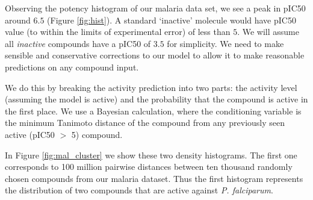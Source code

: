 \documentclass[journal=jacsat,manuscript=article]{achemso}
\begin{document}
Observing the potency histogram of our malaria data set, we see a peak in pIC50 around $6.5$ (Figure \ref{fig:hist}).  A standard `inactive' molecule would have pIC50 value (to within the limits of experimental error) of less than $5$\cite{koutsoukas_2013}.  
We will assume all \textit{inactive} compounds have a pIC50 of $3.5$ for simplicity.
\newline
\newline
We need to make sensible and conservative corrections to our model to allow it to make reasonable predictions on any compound input.  

We do this by breaking the activity prediction into two parts: the activity level (assuming the model is active) and the probability that the compound is active in the first place.  We use a Bayesian calculation, where the conditioning variable is the minimum Tanimoto distance of the compound from any previously seen active (pIC50 $>$ 5) compound.

In Figure \ref{fig:mal_cluster} we show these two density histograms. 
The first one corresponds to 100 million pairwise distances between ten thousand randomly chosen compounds from our malaria dataset.  Thus the first histogram represents the distribution of two compounds that are active against {\it P. falciparum}.
\end{document}
